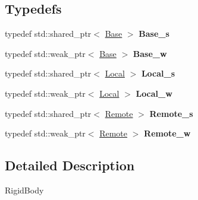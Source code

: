 \subsection*{\-Typedefs}
\begin{DoxyCompactItemize}
\item 
\hypertarget{namespaceNeb_1_1Actor_1_1RigidBody_a953c70038630d58e65077d3129d0ccbe}{typedef std\-::shared\-\_\-ptr$<$ \hyperlink{classNeb_1_1Actor_1_1RigidBody_1_1Base}{\-Base} $>$ {\bfseries \-Base\-\_\-s}}\label{namespaceNeb_1_1Actor_1_1RigidBody_a953c70038630d58e65077d3129d0ccbe}

\item 
\hypertarget{namespaceNeb_1_1Actor_1_1RigidBody_a07d096148943a9bb0bcb238b566ff2f3}{typedef std\-::weak\-\_\-ptr$<$ \hyperlink{classNeb_1_1Actor_1_1RigidBody_1_1Base}{\-Base} $>$ {\bfseries \-Base\-\_\-w}}\label{namespaceNeb_1_1Actor_1_1RigidBody_a07d096148943a9bb0bcb238b566ff2f3}

\item 
\hypertarget{namespaceNeb_1_1Actor_1_1RigidBody_affa34248731d453214458ea74e1334da}{typedef std\-::shared\-\_\-ptr$<$ \hyperlink{classNeb_1_1Actor_1_1RigidBody_1_1Local}{\-Local} $>$ {\bfseries \-Local\-\_\-s}}\label{namespaceNeb_1_1Actor_1_1RigidBody_affa34248731d453214458ea74e1334da}

\item 
\hypertarget{namespaceNeb_1_1Actor_1_1RigidBody_a412dd686ec2287e3530d822120a3bba5}{typedef std\-::weak\-\_\-ptr$<$ \hyperlink{classNeb_1_1Actor_1_1RigidBody_1_1Local}{\-Local} $>$ {\bfseries \-Local\-\_\-w}}\label{namespaceNeb_1_1Actor_1_1RigidBody_a412dd686ec2287e3530d822120a3bba5}

\item 
\hypertarget{namespaceNeb_1_1Actor_1_1RigidBody_a2e5fd359b4a4e62122883e4d9f2798de}{typedef std\-::shared\-\_\-ptr$<$ \hyperlink{classNeb_1_1Actor_1_1RigidBody_1_1Remote}{\-Remote} $>$ {\bfseries \-Remote\-\_\-s}}\label{namespaceNeb_1_1Actor_1_1RigidBody_a2e5fd359b4a4e62122883e4d9f2798de}

\item 
\hypertarget{namespaceNeb_1_1Actor_1_1RigidBody_ad3a5b627afdc100593e9cdf9141ae222}{typedef std\-::weak\-\_\-ptr$<$ \hyperlink{classNeb_1_1Actor_1_1RigidBody_1_1Remote}{\-Remote} $>$ {\bfseries \-Remote\-\_\-w}}\label{namespaceNeb_1_1Actor_1_1RigidBody_ad3a5b627afdc100593e9cdf9141ae222}

\end{DoxyCompactItemize}


\subsection{\-Detailed \-Description}
\-Rigid\-Body 